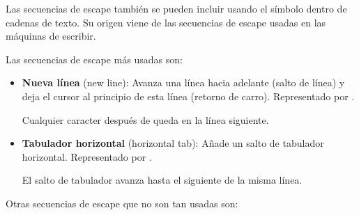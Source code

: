 Las secuencias de escape también se pueden incluir usando el símbolo \ttt{\textbackslash} dentro de cadenas de texto.
Su origen viene de las secuencias de escape usadas en las máquinas de escribir.

Las secuencias de escape más usadas son:

\begin{itemize}
  \item \textbf{Nueva línea} (new line): Avanza una línea hacia adelante (salto de línea) y deja el cursor al principio de esta línea (retorno de carro).
  Representado por .
  
  
  Cualquier caracter después de  queda en la línea siguiente.

  \item \textbf{Tabulador horizontal} (horizontal tab): Añade un salto de tabulador horizontal.
  Representado por .
  
  
  El salto de tabulador avanza hasta el siguiente  de la misma línea.

\end{itemize}

Otras secuencias de escape que no son tan usadas son:

